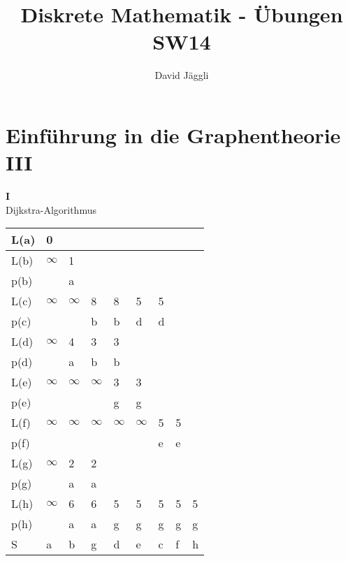 \documentclass[12pt]{scrartcl}
\author{David Jäggli}
\title{Diskrete Mathematik - Übungen SW14}
\begin{document}
\maketitle

\tableofcontents

\newpage
\section{Einführung in die Graphentheorie III}
\textbf{I}\\
Dijkstra-Algorithmus\\
\renewcommand{\arraystretch}{1.5}
\begin{center}
    \begin{tabular}{ | C{3em} | C{3em} | C{3em} | C{3em} | C{3em} | C{3em} | C{3em} | C{3em} | C{3em} | }
        \hline
        L(a) & 0        &           &           &           &           &           &           & \\
        \hline
        L(b) & $\infty$ & 1         &           &           &           &           &           & \\
        p(b) &          & a         &           &           &           &           &           & \\
        \hline
        L(c) & $\infty$ & $\infty$  & 8         & 8         & 5         & 5         & & \\
        p(c) &          &           & b         & b         & d         & d         & & \\
        \hline
        L(d) & $\infty$ & 4         & 3         & 3         &           &           &           & \\
        p(d) &          & a         & b         & b         &           &           &           & \\
        \hline
        L(e) & $\infty$ & $\infty$  & $\infty$  & 3         & 3         &           & & \\
        p(e) &          &           &           & g         & g         &           & & \\
        \hline
        L(f) & $\infty$ & $\infty$  & $\infty$  & $\infty$  & $\infty$  & 5         & 5         & \\
        p(f) &          &           &           &           &           & e         & e         & \\
        \hline
        L(g) & $\infty$ & 2         & 2         &           &           &           &           & \\
        p(g) &          & a         & a         &           &           &           &           & \\
        \hline
        L(h) & $\infty$ & 6         & 6         & 5         & 5         & 5         & 5         & 5 \\
        p(h) &          & a         & a         & g         & g         & g         & g         & g \\
        \hline
        S & a & b & g & d & e & c & f & h \\
        \hline
    \end{tabular}
\end{center}
\end{document}
